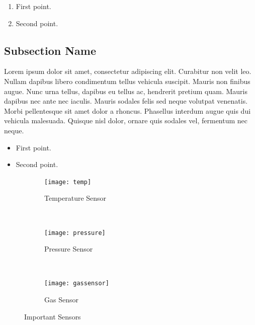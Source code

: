 \documentclass[12pt,a4paper]{report}
\begin{document}
\begin{enumerate}
\item First point.
\item Second point.
\end{enumerate}

\subsection{Subsection Name}
Lorem ipsum dolor sit amet, consectetur adipiscing elit. Curabitur non velit leo. Nullam dapibus libero condimentum tellus vehicula suscipit. Mauris non finibus augue. Nunc urna tellus, dapibus eu tellus ac, hendrerit pretium quam. Mauris dapibus nec ante nec iaculis. Mauris sodales felis sed neque volutpat venenatis. Morbi pellentesque sit amet dolor a rhoncus. Phasellus interdum augue quis dui vehicula malesuada. Quisque nisl dolor, ornare quis sodales vel, fermentum nec neque. 

\begin{itemize}
\item First point.
\item Second point.
\end{itemize}


\begin{figure}
        \centering
        \begin{subfigure}[b]{0.3\textwidth}
                \texttt{[image: temp]}
                \caption{Temperature Sensor}
                \label{fig:Temperature Sensor}
        \end{subfigure}%
        ~ %
        \begin{subfigure}[b]{0.3\textwidth}
                \texttt{[image: pressure]}
                \caption{Pressure Sensor}
                \label{fig:Pressure Sensor}
        \end{subfigure}
        ~ %
        \begin{subfigure}[b]{0.3\textwidth}
                \texttt{[image: gassensor]}
                \caption{Gas Sensor}
                \label{fig:Gas Sensor}
        \end{subfigure}
        \caption{Important Sensors}\label{fig:Main Sensors}
\end{figure}
\end{document}
